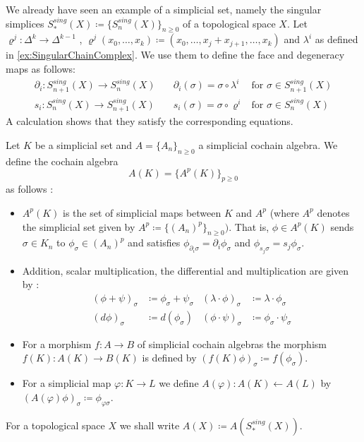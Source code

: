  \begin{Example}
 \label{ex:SingularSimplicesAreSimplicialSets}
    We already have seen an example of a simplicial set, namely the singular simplices 
    $S^{sing}_*(X) \coloneqq {\lbrace S_n^{sing}(X) \rbrace}_{n \geq 0}$ of a topological space $X$.
    Let
    $\varrho^j \colon \Delta^k \to \Delta^{k - 1}$ ,
    ${\varrho^j(x_0, \dotsc , x_k) \coloneqq (x_0 , \dotsc, x_j + x_{j + 1} , \dotsc, x_k)}$ and 
    $\lambda^i$ as defined in \ref{ex:SingularChainComplex}. We use them to define the face
    and degeneracy maps as follows:
    \begin{align*}
     \partial_i \colon S_{n+1}^{sing}(X) \to S_n^{sing}(X) \quad	 &	 \partial_i(\sigma) =
      \sigma \circ \lambda^i  & \text{for $\sigma \in S_{n+1}^{sing}(X)$} 	\\
     s_i \colon S_n^{sing}(X) \to S_{n+1}^{sing}(X) \quad	&	s_i( \sigma) =
     \sigma \circ \varrho^i  & \text{for $\sigma \in S_{n}^{sing}(X)$}
    \end{align*}
    A calculation shows that they satisfy the corresponding equations.
 \end{Example}

 \begin{Definition}
  Let $K$ be a simplicial set and $A = { \lbrace A_n \rbrace}_{n \geq 0}$ a simplicial cochain algebra. We define the cochain algebra
  $$ A(K) = { \lbrace A^p(K) \rbrace}_{ p \geq 0} $$
  as follows :
  \begin{itemize}
   \item $A^p(K)$ is the set of simplicial maps between $K$ and $A^p$ 
   (where $A^p$ denotes the simplicial set given by $A^p \coloneqq {\lbrace (A_n)^p \rbrace}_{n \geq 0})$. That is,
   $\phi \in A^p(K)$ sends $\sigma \in K_n$ to $\phi_{\sigma} \in {(A_n)}^p$ and satisfies 
   $\phi_{ \partial_i \sigma} = \partial_i \phi_{\sigma}$ and $\phi_{ s_j \sigma} = s_j \phi_{\sigma}$.
   
   \item Addition, scalar multiplication, the differential and multiplication are given by :
   \begin{align*}
    (\phi + \psi)_{\sigma} &\coloneqq \phi_{\sigma} + \psi_{\sigma} & 
    (\lambda \cdot \phi)_{\sigma} &\coloneqq \lambda \cdot \phi_{\sigma} \\
    (d \phi)_{\sigma} &\coloneqq d( \phi_{\sigma}) &  
    {(\phi \cdot \psi)}_{\sigma} &\coloneqq \phi_{\sigma}  \cdot \psi_{\sigma}
   \end{align*}
  
    \item For a morphism $f \colon A \to B$ \; of simplicial cochain algebras the morphism
      $f(K) \colon A(K) \to B(K)$ is defined by $(f(K) \phi)_{\sigma} \coloneqq f(\phi_{\sigma})$.
    
    \item For a simplicial map $\varphi \colon K \to L$ we define ${A(\varphi) \colon A(K) \gets A(L)}$
      by $(A(\varphi) \phi)_{\sigma} \coloneqq \phi_{\varphi \sigma}$.
  \end{itemize}
  For a topological space $X$ we shall write $A(X) \coloneqq A(S_*^{sing}(X))$.
 \end{Definition}

